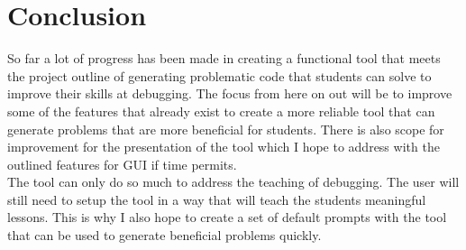 \documentclass[12pt]{extarticle}
\begin{document}
\newpage
\section{Conclusion}

So far a lot of progress has been made in creating a functional tool that meets the project outline of generating problematic code that students can solve to improve their skills at debugging. The focus from here on out will be to improve some of the features that already exist to create a more reliable tool that can generate problems that are more beneficial for students. There is also scope for improvement for the presentation of the tool which I hope to address with the outlined features for GUI if time permits.\\
The tool can only do so much to address the teaching of debugging. The user will still need to setup the tool in a way that will teach the students meaningful lessons. This is why I also hope to create a set of default prompts with the tool that can be used to generate beneficial problems quickly.
\end{document}

